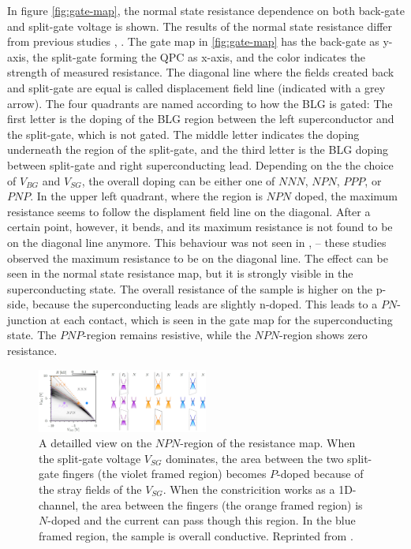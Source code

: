 In figure \ref{fig:gate-map}, the normal state resistance dependence on both back-gate and split-gate voltage is shown. The results of the normal state resistance differ from previous studies \cite{Oostinga2008}, \cite{Taychatanapat2010}. The gate map in \ref{fig:gate-map} has the back-gate as y-axis, the split-gate forming the QPC as x-axis, and the color indicates the strength of measured resistance. The diagonal line where the fields created back and split-gate are equal is called displacement field line (indicated with a grey arrow). The four quadrants are named according to how the BLG is gated: The first letter is the doping of the BLG region between the left superconductor and the split-gate, which is not gated. The middle letter indicates the doping underneath the region of the split-gate, and the third letter is the BLG doping between split-gate and right superconducting lead. Depending on the the choice of $V_{BG}$ and $V_{SG}$, the overall doping can be either one of $NNN$, $NPN$, $PPP$, or $PNP$. In the upper left quadrant, where the region is $NPN$ doped, the maximum resistance seems to follow the displament field line on the diagonal. After a certain point, however, it bends, and its maximum resistance is not found to be on the diagonal line anymore. This behaviour was not seen in  \cite{Oostinga2008}, \cite{Taychatanapat2010} -- these studies observed the maximum resistance to be on the diagonal line. The effect can be seen in the normal state resistance map, but it is strongly visible in the superconducting state. The overall resistance of the sample is higher on the p-side, because the superconducting leads are slightly n-doped. This leads to a $PN$-junction at each contact, which is seen in the gate map for the superconducting state. The $PNP$-region remains resistive, while the $NPN$-region shows zero resistance.
\begin{figure}
\centering
\includegraphics[width=0.5\textwidth]{figure/experiment/npn-region-detail}
\caption{A detailled view on the $NPN$-region of the resistance map. When the split-gate voltage $V_{SG}$ dominates, the area between the two split-gate fingers (the violet framed region) becomes $P$-doped because of the stray fields of the $V_{SG}$. When the constricition works as a 1D-channel, the area between the fingers (the orange framed region) is $N$-doped and the current can pass though this region. In the blue framed region, the sample is overall conductive. Reprinted from \cite{Kraft2017}.}\label{fig:npn-regions-gates}
\end{figure}
